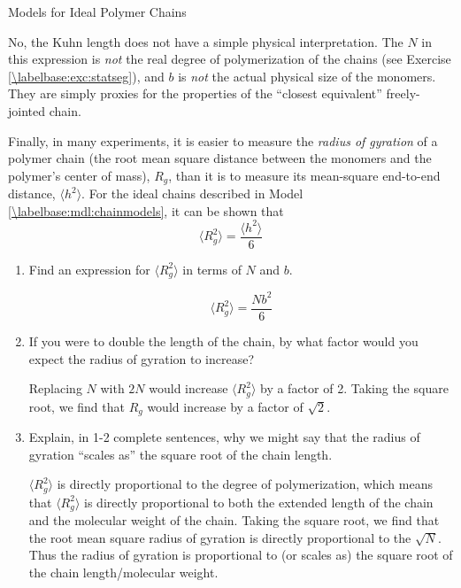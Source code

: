 \begin{activity}{Models for Ideal Polymer Chains}
\begin{ctqs}
		\begin{solution}[1.25in]{}
			No, the Kuhn length does not have a simple physical interpretation.  The $N$ in this expression is \emph{not} the real degree of polymerization of the chains (see Exercise \ref{\labelbase:exc:statseg}), and $b$ is \emph{not} the actual physical size of the monomers.  They are simply proxies for the properties of the ``closest equivalent'' freely-jointed chain.
		\end{solution}
	
	\question Finally, in many experiments, it is easier to measure the \emph{radius of gyration} of a polymer chain (the root mean square distance between the monomers and the polymer's center of mass), $R_g$, than it is to measure its mean-square end-to-end distance, $\langle h^2\rangle$.  For the ideal chains described in Model \ref{\labelbase:mdl:chainmodels}, it can be shown that
		\begin{equation*}
			\langle R_g^2\rangle = \frac{\langle h^2\rangle}{6}
		\end{equation*}
		
		\begin{enumerate}
			\item Find an expression for $\langle R_g^2 \rangle$ in terms of $N$ and $b$.
	
		\begin{solution}[0.75in]{}
			\begin{equation*}
				\langle R_g^2 \rangle = \frac{Nb^2}{6}
			\end{equation*}
		\end{solution}
			
			\item If you were to double the length of the chain, by what factor would you expect the radius of gyration to increase?
	
		\begin{solution}[0.75in]{}
			Replacing $N$ with $2N$ would increase $\langle R_g^2 \rangle$ by a factor of 2. Taking the square root, we find that $R_g$ would increase by a factor of $\sqrt{2}$.
		\end{solution}
			
			\item Explain, in 1-2 complete sentences, why we might say that the radius of gyration ``scales as'' the square root of the chain length.
	
		\begin{solution}[1.5in]{}
			$\langle R_g^2 \rangle$ is directly proportional to the degree of polymerization, which means that $\langle R_g^2 \rangle$ is directly proportional to both the extended length of the chain and the molecular weight of the chain.  Taking the square root, we find that the root mean square radius of gyration is directly proportional to the $\sqrt{N}$.  Thus the radius of gyration is proportional to (or scales as) the square root of the chain length/molecular weight.
		\end{solution}
		\end{enumerate}
	

\end{ctqs}
\end{activity}
